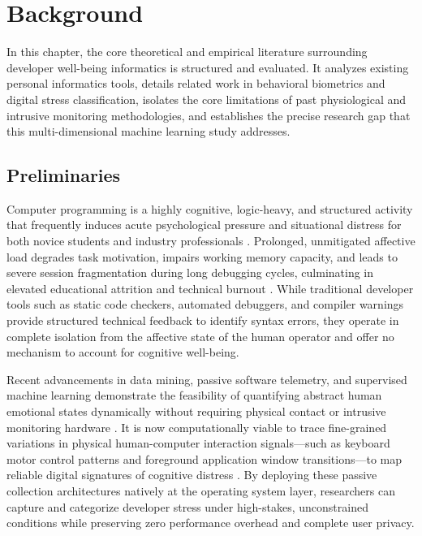 \chapter{Background}

In this chapter, the core theoretical and empirical literature surrounding developer well-being informatics is structured and evaluated. It analyzes existing personal informatics tools, details related work in behavioral biometrics and digital stress classification, isolates the core limitations of past physiological and intrusive monitoring methodologies, and establishes the precise research gap that this multi-dimensional machine learning study addresses.

\section{Preliminaries}
Computer programming is a highly cognitive, logic-heavy, and structured activity that frequently induces acute psychological pressure and situational distress for both novice students and industry professionals \cite{acm4897123, springer2020}. Prolonged, unmitigated affective load degrades task motivation, impairs working memory capacity, and leads to severe session fragmentation during long debugging cycles, culminating in elevated educational attrition and technical burnout \cite{stemedu2025, mdpi5739}. While traditional developer tools such as static code checkers, automated debuggers, and compiler warnings provide structured technical feedback to identify syntax errors, they operate in complete isolation from the affective state of the human operator and offer no mechanism to account for cognitive well-being.

\noindent Recent advancements in data mining, passive software telemetry, and supervised machine learning demonstrate the feasibility of quantifying abstract human emotional states dynamically without requiring physical contact or intrusive monitoring hardware \cite{mdpi389}. It is now computationally viable to trace fine-grained variations in physical human-computer interaction signals---such as keyboard motor control patterns and foreground application window transitions---to map reliable digital signatures of cognitive distress \cite{bunia2024keystroke, realtimeStress2012}. By deploying these passive collection architectures natively at the operating system layer, researchers can capture and categorize developer stress under high-stakes, unconstrained conditions while preserving zero performance overhead and complete user privacy.

